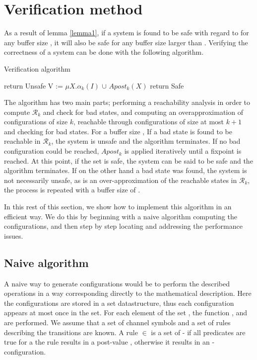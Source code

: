 
\section{Verification method}
\label{alg1}
As a result of lemma \ref{lemma1}, if a system is found to be safe with regard to  for any buffer size , it will also be safe for any buffer size larger than . Verifying the correctness of a system can be done with the following algorithm.

\begin{algorithm}
  \caption{Verification algorithm}\label{euclid}
  \begin{algorithmic}[1]
        \State return Unsafe
        \EndIf
        \State V := $\mu X.\alpha_k(I)$ $\cup$ $Apost_k(X)$
        \State return Safe     
        \EndIf
      \EndFor
\end{algorithmic}
\end{algorithm}

The algorithm has two main parts; performing a reachability analysis in order to compute $\mathcal{R}_k$ and check for bad states, and computing an overapproximation of configurations of size $k$, reachable through configurations of size at most $k+1$ and checking for bad states. For a buffer size , If a bad state is found to be reachable in $\mathcal{R}_k$, the system is unsafe and the algorithm terminates. If no bad configuration could be reached, $Apost_k$ is applied iteratively until a fixpoint  is reached. At this point, if the set  is safe, the system can be said to be safe and the algorithm terminates. If on the other hand a bad state was found, the system is not necessarily unsafe, as  is an over-approximation of the reachable states in $\mathcal{R}_k$, the process is repeated with a buffer size of .

In this rest of this section, we show how to implement this algorithm in an efficient way. We do this by beginning with a naive algorithm computing the configurations, and then step by step locating and addressing the performance issues. 

\subsection{Naive algorithm}
A naive way to generate configurations would be to perform the described operations in a way corresponding directly to the mathematical description. Here the configurations are stored in a set datastructure, thus each configuration appears at most once in the set. For each element  of the set , the function ,  and  are performed. We assume that a set of channel symbols and a set of rules  describing the transitions are known. A rule  $\in$  is a set of  - if all predicates are true for a  the rule results in a post-value , otherwise it results in an -configuration.

